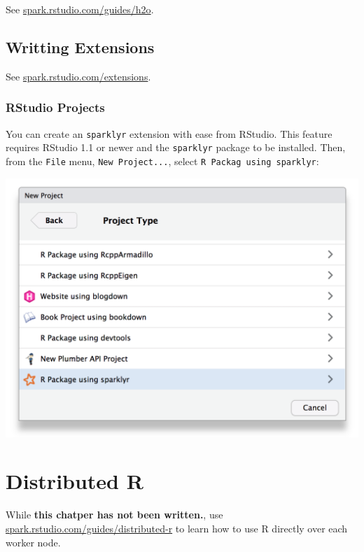 \documentclass[]{book}
\theoremstyle{definition}
\theoremstyle{definition}
\theoremstyle{definition}
\theoremstyle{remark}
\begin{document}
See
\href{http://spark.rstudio.com/guides/h2o/}{spark.rstudio.com/guides/h2o}.

\hypertarget{writting-extensions}{%
\section{Writting Extensions}\label{writting-extensions}}

See
\href{http://spark.rstudio.com/extensions/}{spark.rstudio.com/extensions}.

\hypertarget{rstudio-projects}{%
\subsection{RStudio Projects}\label{rstudio-projects}}

You can create an \texttt{sparklyr} extension with ease from RStudio.
This feature requires RStudio 1.1 or newer and the \texttt{sparklyr}
package to be installed. Then, from the \texttt{File} menu,
\texttt{New\ Project...}, select \texttt{R\ Packag\ using\ sparklyr}:

\includegraphics{images/08-extensions-rstudio-project.png}

\hypertarget{distributed}{%
\chapter{Distributed R}\label{distributed}}

While \textbf{this chatper has not been written.}, use
\href{http://spark.rstudio.com/guides/distributed-r/}{spark.rstudio.com/guides/distributed-r}
to learn how to use R directly over each worker node.
\end{document}
